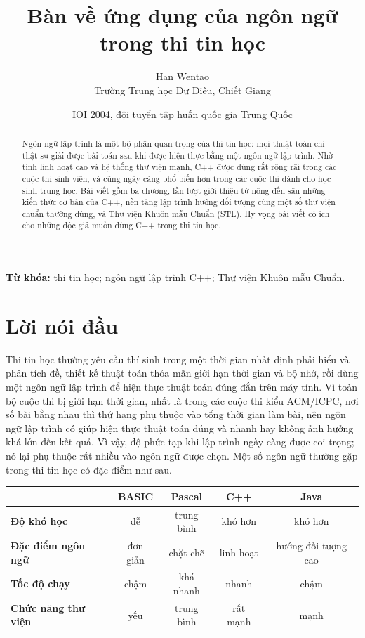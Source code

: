 \documentclass[11pt]{article}
\title{Bàn về ứng dụng của ngôn ngữ \cpp{} trong thi tin học}
\author{Han Wentao\\Trường Trung học Dư Diêu, Chiết Giang}
\date{IOI 2004, đội tuyển tập huấn quốc gia Trung Quốc}
\newcommand{\cpp}{C++}
\newcommand{\pascal}{Pascal}
\begin{document}
\maketitle


\begin{abstract}
Ngôn ngữ lập trình là một bộ phận quan trọng của thi tin học: mọi thuật toán
chỉ thật sự giải được bài toán sau khi được hiện thực bằng một ngôn ngữ lập
trình. Nhờ tính linh hoạt cao và hệ thống thư viện mạnh, \cpp{} được dùng rất
rộng rãi trong các cuộc thi sinh viên, và cũng ngày càng phổ biến hơn trong
các cuộc thi dành cho học sinh trung học. Bài viết gồm ba chương, lần lượt
giới thiệu từ nông đến sâu những kiến thức cơ bản của \cpp{}, nền tảng lập
trình hướng đối tượng cùng một số thư viện chuẩn thường dùng, và Thư viện
Khuôn mẫu Chuẩn (STL). Hy vọng bài viết có ích cho những độc giả muốn dùng
\cpp{} trong thi tin học.
\end{abstract}

\noindent\textbf{Từ khóa:} thi tin học; ngôn ngữ lập trình \cpp{}; Thư viện
Khuôn mẫu Chuẩn.

\tableofcontents

\section*{Lời nói đầu}

Thi tin học thường yêu cầu thí sinh trong một thời gian nhất định phải hiểu
và phân tích đề, thiết kế thuật toán thỏa mãn giới hạn thời gian và bộ nhớ,
rồi dùng một ngôn ngữ lập trình để hiện thực thuật toán đúng đắn trên máy
tính. Vì toàn bộ cuộc thi bị giới hạn thời gian, nhất là trong các cuộc thi
kiểu ACM/ICPC, nơi số bài bằng nhau thì thứ hạng phụ thuộc vào tổng thời gian
làm bài, nên ngôn ngữ lập trình có giúp hiện thực thuật toán đúng và nhanh hay
không ảnh hưởng khá lớn đến kết quả. Vì vậy, độ phức tạp khi lập trình ngày
càng được coi trọng; nó lại phụ thuộc rất nhiều vào ngôn ngữ được chọn. Một
số ngôn ngữ thường gặp trong thi tin học có đặc điểm như sau.

\begin{center}
\begin{tabular}{>{\bfseries}lcccc}
\hline
 & BASIC & \pascal{} & \cpp{} & Java\\
\hline
Độ khó học & dễ & trung bình & khó hơn & khó hơn\\
Đặc điểm ngôn ngữ & đơn giản & chặt chẽ & linh hoạt & hướng đối tượng cao\\
Tốc độ chạy & chậm & khá nhanh & nhanh & chậm\\
Chức năng thư viện & yếu & trung bình & rất mạnh & mạnh\\
\hline
\end{tabular}
\end{center}
\end{document}
